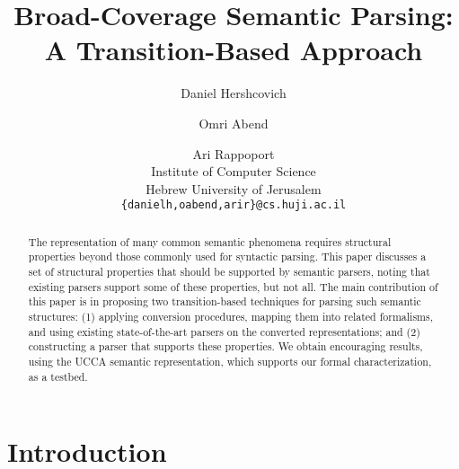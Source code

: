 \documentclass[11pt]{article}
\title{Broad-Coverage Semantic Parsing: A Transition-Based Approach}
\author{Daniel Hershcovich \and Omri Abend \and Ari Rappoport \\
  Institute of Computer Science \\
  Hebrew University of Jerusalem \\
  {\tt \{danielh,oabend,arir\}@cs.huji.ac.il}
}
\date{}
\begin{document}
\maketitle

\begin{abstract}

  The representation of many common semantic phenomena requires 
  structural properties beyond those commonly used for syntactic parsing.
  This paper discusses a set of structural properties that should be supported
  by semantic parsers, noting that existing parsers support some of these properties,
  but not all.
  The main contribution of this paper is in proposing
  two transition-based techniques for parsing such semantic structures:
  (1) applying conversion procedures,
  mapping them into related formalisms, and using existing state-of-the-art
  parsers on the converted representations;
  and (2) constructing a parser that supports these properties.
  We obtain encouraging results, using the UCCA semantic representation, which
  supports our formal characterization, as a testbed.
  
  
\end{abstract}



\section{Introduction}
\end{document}
